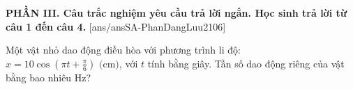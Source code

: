 
\noindent \textbf{PHẦN III. Câu trắc nghiệm yêu cầu trả lời ngắn. Học sinh trả lời từ câu 1 đến câu 4.}
[ans/ansSA-PhanDangLuu2106]

\begin{ex}%
	Một vật nhỏ dao động điều hòa với phương trình li độ: $x = 10 \cos\left(\pi t + \frac{\pi}{6}\right)\text{ (cm)}$, với $t$ tính bằng giây. Tần số dao động riêng của vật bằng bao nhiêu Hz?
\end{ex}

